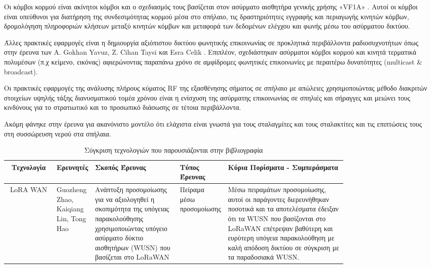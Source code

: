 \documentclass[12pt, greek]{article}
\begin{document}
\begin{multicols*}{2}
        Οι κόμβοι κορμού είναι ακίνητοι
        κόμβοι και ο σχεδιασμός τους βασίζεται στον ασύρματο αισθητήρα γενικής
        χρήσης «VF1A» \cite{walsh_communications_2018}.
        Αυτοί οι κόμβοι είναι υπεύθυνοι για διατήρηση της συνδεσιμότητας κορμού μέσα 
        στο σπήλαιο, τις δραστηριότητες
        εγγραφής και περιαγωγής κινητών κόμβων, δρομολόγηση πληροφοριών κλήσεων μεταξύ
        κινητών κόμβων και μεταφορά των δεδομένων ελέγχου και φωνής μέσω του ασύρματου
        δικτύου.

        Άλλες πρακτικές εφαρμογές είναι η δημιουργία αξιόπιστου δικτύου φωνητικής επικοινωνίας
        σε προκλητικά περιβάλλοντα ραδιοσυχνοτήτων όπως στην έρευνα των A. Gokhan Yavuz, 
        Z. Cihan Taysi και Esra Celik \cite{yavuz_-cave_2009}. Επιπλέον, σχεδιάστηκαν
        ασύρματοι κόμβοι κορμού και κινητά τερματικά πολυμέσων (π.χ κείμενο, εικόνας) 
        αφιερώνοντας παραπάνω χρόνο σε αμφίδρομες φωνητικές επικοινωνίες με περαιτέρω
        δυνατότητες (multicast \& broadcast).

        Οι πρακτικές εφαρμογές της ανάλυσης πλήρους κύματος RF της εξασθένησης σήματος σε σπήλαιο
        με απώλειες χρησιμοποιώντας μέθοδο διακριτών στοιχείων υψηλής τάξης διανυσματικού τομέα
        χρόνου \cite{pingenot_full_2005} είναι η ενίσχυση της ασύρματης επικοινωνίας σε σπηλιές
        και σήραγγες και μειώνει τους κινδύνους για το στρατιωτικό και το προσωπικό διάσωσης σε τέτοια
        περιβάλλοντα.

        Ακόμη φάνηκε στην έρευνα για ακανόνιστο μοντέλο \cite{soo_measurement_2019} ότι ελάχιστα
        είναι γνωστά για τους σταλαγμίτες και τους σταλακτίτες και τις επιπτώσεις τους στη 
        συσσώρευση νερού στα σπήλαια.
\end{multicols*}
\begin{landscape}
    \begin{table}
        \caption{Σύγκριση τεχνολογιών που παρουσιάζονται στην βιβλιογραφία}
        \label{table:comparison}
        \centering
        \begin{tabular}{cp{0.1\linewidth}p{0.25\linewidth}p{0.1\linewidth}p{0.35\linewidth}}
        \toprule
        Τεχνολογία & Ερευνητές & Σκοπός Έρευνας & Τύπος Έρευνας & Κύρια Πορίσματα - Συμπεράσματα \\
        \midrule
        LoRA WAN & Guozheng Zhao, Kaiqiang Lin, Tong Hao \cite{zhao_feasibility_2023} 
        & Ανάπτυξη προσομοίωσης για να αξιολογηθεί η σκοπιμότητα της υπόγειας παρακολούθησης χρησιμοποιώντας
        υπόγειο ασύρματο δύκτιο αισθητήρων (WUSN) που βασίζεται στο LoRaWAN & Πείραμα μέσω προσομοίωσης 
        & Μέσω πειραμάτων προσομοίωσης, αυτοί οι παράγοντες διερευνήθηκαν ποσοτικά και τα αποτελέσματα
        έδειξαν ότι τα WUSN που βασίζονται στο LoRaWAN επέτρεψαν βαθύτερη και ευρύτερη υπόγεια
        παρακολούθηση με καλή απόδοση δικτύου σε σύγκριση με τα παραδοσιακά WUSN.\\
        \bottomrule
        \end{tabular}
    \end{table}      
\end{landscape}
\end{document}
